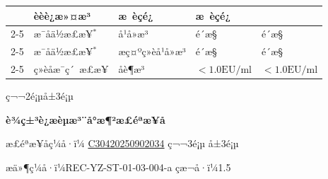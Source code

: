 \documentclass[UTF8,10pt,a4paper,fontset=fandol]{ctexart}
\newcommand{\fieldvalue}[1]{#1}
\begin{document}
\begin{tabularx}{\textwidth}{|p{2.2cm}|p{3.0cm}|p{2.7cm}|X|X|}
&
\fieldvalue{èèè¿æ»¤æ³}
&
\fieldvalue{æ èçé¿}
&
\fieldvalue{æ èçé¿}
\\ \cline{2-5}
&
\fieldvalue{æ¯åä½æ£æ¥$^{*}$}
&
\fieldvalue{å¹å»æ³}
&
\fieldvalue{é´æ§}
&
\fieldvalue{é´æ§}
\\ \cline{2-5}
&
\fieldvalue{æ¯åä½æ£æ¥$^{*}$}
&
\fieldvalue{æç¤ºç»èå¹å»æ³}
&
\fieldvalue{é´æ§}
&
\fieldvalue{é´æ§}
\\ \cline{2-5}
&
\fieldvalue{ç»èåæ¯ç´ æ£æ¥}
&
\fieldvalue{åè¶æ³}
&
\fieldvalue{$<1.0\mathrm{EU}/\mathrm{ml}$}
&
\fieldvalue{$<1.0\mathrm{EU}/\mathrm{ml}$}
\\ \hline
\end{tabularx}
\normalsize

\begin{center}
ç¬¬2é¡µå±3é¡µ
\end{center}


\newpage

\begin{center}
\textbf{è¾ç±³è¿æèµæ³¨å°æ¶²æ£éªæ¥å}

æ£éªæ¥åç¼å·ï¼
\fieldvalue{\underline{C30420250902034}} \quad ç¬¬3é¡µ å±3é¡µ
\end{center}

\noindent
æä»¶ç¼å·ï¼REC-YZ-ST-01-03-004-a \qquad çæ¬å·ï¼1.5
\end{document}
